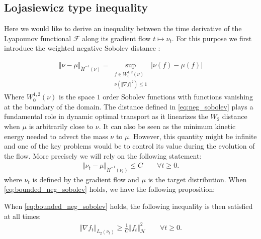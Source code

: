 \subsection{Lojasiewicz type inequality}

Here we would like to derive an inequality between the time derivative of the Lyapounov functional $\mathcal{F}$ along its gradient flow $t\mapsto \nu_t$. For this purpose we first introduce the weighted negative Sobolev distance :

\begin{align}\label{eq:neg_sobolev}
	\Vert \nu - \mu \Vert_{\dot{H}^{-1}(\nu)} = \sup_{\substack{ f\in W_0^{1,2}(\nu) \\ \nu(\Vert \nabla f \Vert^2) \leq 1 }} \vert \nu(f)-\mu(f)\vert 
\end{align}
Where $W_0^{1,2}(\nu)$ is the space $1$ order Sobolev functions with functions vanishing at the boundary of the domain.
The distance defined in \cref{eq:neg_sobolev} plays a fundamental role in dynamic optimal transport as it linearizes the $W_2$ distance when $\mu$ is arbitrarily close to $\nu$. It can also be seen as the minimum kinetic energy needed to advect the mass $\nu$ to $\mu$. However, this quantity might be infinite  and one of the key problems would be to control its value during the evolution of the flow. More precisely we will rely on the following statement:
\begin{align}\label{eq:bounded_neg_sobolev}
	\Vert \nu_t  - \mu \Vert_{\dot{H}^{-1}(\nu_t)} \leq C \qquad \forall t\geq 0.
\end{align} 
where $\nu_t$ is defined by the gradient flow and $\mu$ is the target distribution. When \cref{eq:bounded_neg_sobolev}  holds, we have the following proposition:
\begin{proposition}\label{prop:PL_type_inequality}
	When \cref{eq:bounded_neg_sobolev} holds, the following inequality is then satisfied at all times:
	\begin{align}\label{eq:PL_type_inequality}
		\Vert \nabla f_t \Vert_{L_2(\nu_t)} \geq \frac{1}{C} \Vert f_t \Vert^2_{\mathcal{H}} \qquad \forall t\geq 0.
	\end{align}
\end{proposition}

